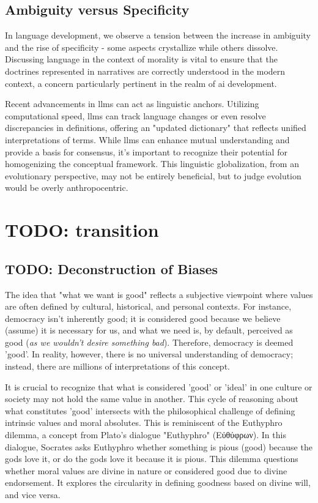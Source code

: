 \documentclass[11pt,a4]{article}
\newcommand{\textgreek}[1]{\begingroup\fontencoding{LGR}\selectfont#1\endgroup}
\begin{document}
    \subsection{Ambiguity versus Specificity}
    In language development, we observe a tension between the increase in ambiguity and the rise of specificity - some aspects crystallize while others dissolve. Discussing language in the context of morality is vital to ensure that the doctrines represented in narratives are correctly understood in the modern context, a concern particularly pertinent in the realm of \acrshort{ai} development.
    \par
    Recent advancements in \glspl{llm} can act as linguistic anchors.
    Utilizing computational speed, \glspl{llm}  can track language changes or even resolve discrepancies in definitions, offering an "updated dictionary" that reflects unified interpretations of terms. While \glspl{llm}  can enhance mutual understanding and provide a basis for consensus, it's important to recognize their potential for homogenizing the conceptual framework. This linguistic globalization, from an evolutionary perspective, may not be entirely beneficial, but to judge evolution would be overly anthropocentric.

    \section{TODO: transition}

    \subsection{TODO: Deconstruction of Biases}
    The idea that "what we want is good" reflects a subjective viewpoint where values are often defined by cultural, historical, and personal contexts. For instance, democracy isn't inherently good; it is considered good because we believe (assume) it is necessary for us, and what we need is, by default, perceived as good (\textit{as we wouldn't desire something bad}). Therefore, democracy is deemed 'good'. In reality, however, there is no universal understanding of democracy; instead, there are millions of interpretations of this concept.
    \par

    It is crucial to recognize that what is considered 'good' or 'ideal' in one culture or society may not hold the same value in another. This cycle of reasoning about what constitutes 'good' intersects with the philosophical challenge of defining intrinsic values and moral absolutes. This is reminiscent of the Euthyphro dilemma, a concept from Plato's dialogue "Euthyphro" \textgreek{(Εὐθύφρων)}. In this dialogue, Socrates asks Euthyphro whether something is pious (good) because the gods love it, or do the gods love it because it is pious. This dilemma questions whether moral values are divine in nature or considered good due to divine endorsement. It explores the circularity in defining goodness based on divine will, and vice versa.
\end{document}

